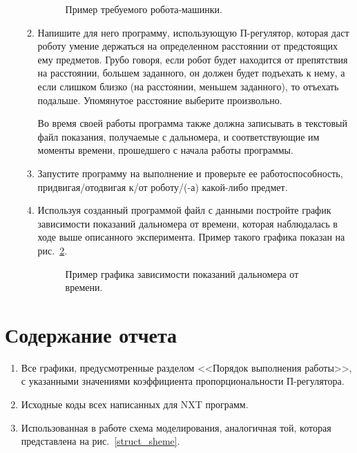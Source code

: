 \documentclass[12pt,a4paper,openany]{extarticle}
\begin{document}
\begin{enumerate}
\begin{enumerate}
\begin{figure}[h!]
\begin{minipage}[h]{0.49\linewidth}
			\end{minipage}
			\caption{Пример требуемого робота-машинки.}
			\label{robocar}
		\end{figure}	
		\item Напишите для него программу, использующую П-регулятор, которая даст роботу умение держаться на определенном расстоянии от предстоящих ему предметов.
		Грубо говоря, если робот будет находится от препятствия на расстоянии, большем заданного, он должен будет подъехать к нему, а если слишком близко (на расстоянии, меньшем заданного), то отъехать подальше.
		Упомянутое расстояние выберите произвольно.

		Во время своей работы программа также должна записывать в текстовый файл показания, получаемые с дальномера, и соответствующие им моменты времени, прошедшего с начала работы программы.
		\item Запустите программу на выполнение и проверьте ее работоспособность, придвигая/отодвигая к/от роботу/(-а) какой-либо предмет.
		\item Используя созданный программой файл с данными постройте график зависимости показаний дальномера от времени, которая наблюдалась в ходе выше описанного эксперимента. Пример такого графика показан на рис.~\ref{distance_with_time}.
		\begin{figure}[h!]
			\caption{Пример графика зависимости показаний дальномера от времени.}
			\label{distance_with_time}
		\end{figure}
	\end{enumerate}
\end{enumerate}
\newpage
\section{Содержание отчета}
\begin{enumerate}
\item Все графики, предусмотренные разделом <<Порядок выполнения работы>>, с указанными значениями коэффициента пропорциональности П-регулятора.
\item Исходные коды всех написанных для NXT программ.
\item Использованная в работе схема моделирования, аналогичная той, которая представлена на рис.~\ref{struct_sheme}.
\end{enumerate}
\end{document}
